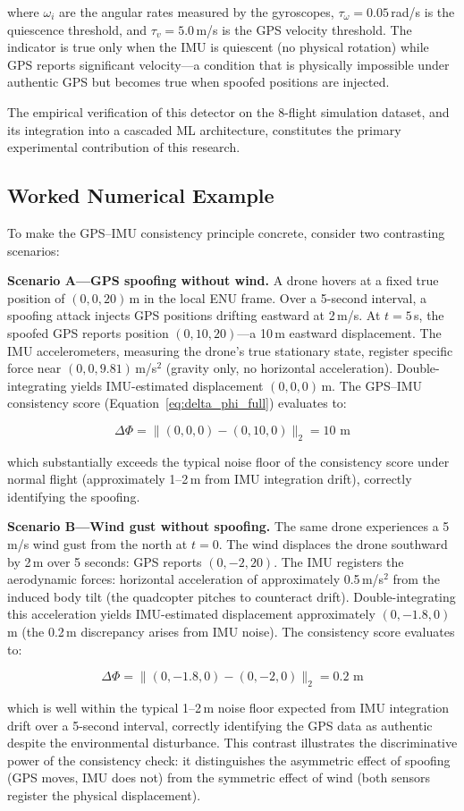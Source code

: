 where \(\omega_i\) are the angular rates measured by the gyroscopes, \(\tau_{\omega} = 0.05\)\,rad/s is the quiescence threshold, and \(\tau_{v} = 5.0\)\,m/s is the GPS velocity threshold. The indicator is true only when the IMU is quiescent (no physical rotation) while GPS reports significant velocity---a condition that is physically impossible under authentic GPS but becomes true when spoofed positions are injected.

The empirical verification of this detector on the 8-flight simulation dataset, and its integration into a cascaded ML architecture, constitutes the primary experimental contribution of this research.

\subsection{Worked Numerical Example}

To make the GPS--IMU consistency principle concrete, consider two contrasting scenarios:

\textbf{Scenario A---GPS spoofing without wind.} A drone hovers at a fixed true position of $(0, 0, 20)$\,m in the local ENU frame. Over a 5-second interval, a spoofing attack injects GPS positions drifting eastward at 2\,m/s. At $t = 5$\,s, the spoofed GPS reports position $(0, 10, 20)$---a 10\,m eastward displacement. The IMU accelerometers, measuring the drone's true stationary state, register specific force near $(0, 0, 9.81)$\,m/s$^2$ (gravity only, no horizontal acceleration). Double-integrating yields IMU-estimated displacement $(0, 0, 0)$\,m. The GPS--IMU consistency score (Equation~\ref{eq:delta_phi_full}) evaluates to:

\[
\Delta \Phi = \| (0, 0, 0) - (0, 10, 0) \|_2 = 10\text{ m}
\]

which substantially exceeds the typical noise floor of the consistency score under normal flight (approximately 1--2\,m from IMU integration drift), correctly identifying the spoofing.

\textbf{Scenario B---Wind gust without spoofing.} The same drone experiences a 5\,m/s wind gust from the north at $t = 0$. The wind displaces the drone southward by 2\,m over 5 seconds: GPS reports $(0, -2, 20)$. The IMU registers the aerodynamic forces: horizontal acceleration of approximately 0.5\,m/s$^2$ from the induced body tilt (the quadcopter pitches to counteract drift). Double-integrating this acceleration yields IMU-estimated displacement approximately $(0, -1.8, 0)$\,m (the 0.2\,m discrepancy arises from IMU noise). The consistency score evaluates to:

\[
\Delta \Phi = \| (0, -1.8, 0) - (0, -2, 0) \|_2 = 0.2\text{ m}
\]

which is well within the typical 1--2\,m noise floor expected from IMU integration drift over a 5-second interval, correctly identifying the GPS data as authentic despite the environmental disturbance. This contrast illustrates the discriminative power of the consistency check: it distinguishes the asymmetric effect of spoofing (GPS moves, IMU does not) from the symmetric effect of wind (both sensors register the physical displacement).
